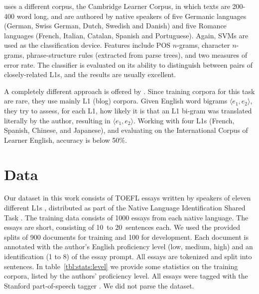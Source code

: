 \documentclass[11pt,letterpaper]{article}
\newcommand{\tref}[1]{table~\ref{#1}}
\begin{document}
\citet{kochmar2011identification} uses a different corpus, the
Cambridge Learner Corpus, in which texts are 200-400 word long, and
are authored by native speakers of five Germanic languages (German,
Swiss German, Dutch, Swedish and Danish) and five Romance languages
(French, Italian, Catalan, Spanish and Portuguese). Again, SVMs are used as the
classification device. Features include POS $n$-grams, character
$n$-grams, phrase-structure rules (extracted from parse trees), and
two measures of error rate. The classifier is evaluated on its ability
to distinguish between pairs of closely-related L1s, and the results
are usually excellent.

A completely different approach is offered by
\citet{brooke2011native}. Since training corpora for this task are
rare, they use mainly L1 (blog) corpora. Given English word bigrams
$\langle e_1,e_2\rangle$, they try to assess, for each L1, how likely
it is that an L1 bi-gram was translated literally by the author,
resulting in $\langle e_1,e_2\rangle$. Working with four L1s (French,
Spanish, Chinese, and Japanese), and evaluating on the International
Corpus of Learner English, accuracy is below 50\%.

\section{Data}
\label{sec:data}
Our dataset in this work consists of TOEFL essays
written by speakers of eleven different L1s
\citep{blanchard-tetreault-higgins-cahill-chodorow:2013:TOEFL11-RR},
distributed as part of the Native Language Identification Shared
Task \citep{tetreault-blanchard-cahill:2013:BEA}. The training data consists of 1000 essays from each native language. The essays are short, consisting of 10~to 20~sentences each. We used the provided splits of 900 documents for training and 100 for development. Each document is annotated with the author's English proficiency level (low, medium, high) and an identification (1 to 8) of the essay prompt. All essays are tokenized and split into sentences. In \tref{tbl:stats:level} we provide some statistics on the training corpora, listed by the authors' proficiency level. All essays were tagged with the Stanford part-of-speech tagger
\citep{toutanova-03}. We did not parse the dataset.
\end{document}
